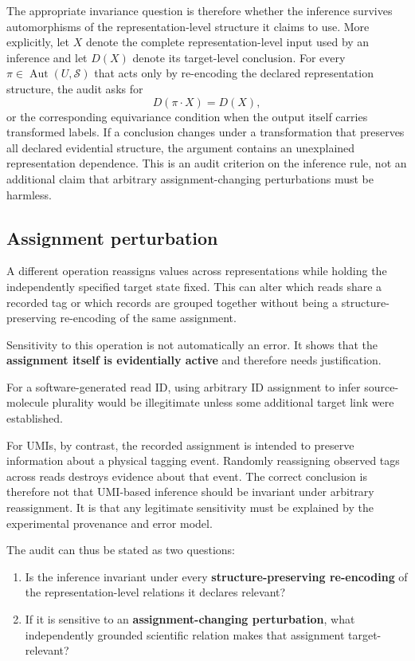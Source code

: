 \documentclass[11pt]{article}
\begin{document}
The appropriate invariance question is therefore whether the inference survives automorphisms of the representation-level structure it claims to use. More explicitly, let \(X\) denote the complete representation-level input used by an inference and let \(D(X)\) denote its target-level conclusion. For every \(\pi\in\operatorname{Aut}(U,\mathcal S)\) that acts only by re-encoding the declared representation structure, the audit asks for
\[
D(\pi\cdot X)=D(X),
\]
or the corresponding equivariance condition when the output itself carries transformed labels. If a conclusion changes under a transformation that preserves all declared evidential structure, the argument contains an unexplained representation dependence. This is an audit criterion on the inference rule, not an additional claim that arbitrary assignment-changing perturbations must be harmless.

\subsection{Assignment perturbation}

A different operation reassigns values across representations while holding the independently specified target state fixed. This can alter which reads share a recorded tag or which records are grouped together without being a structure-preserving re-encoding of the same assignment.

Sensitivity to this operation is not automatically an error. It shows that the \textbf{assignment itself is evidentially active} and therefore needs justification.

For a software-generated read ID, using arbitrary ID assignment to infer source-molecule plurality would be illegitimate unless some additional target link were established.

For UMIs, by contrast, the recorded assignment is intended to preserve information about a physical tagging event. Randomly reassigning observed tags across reads destroys evidence about that event. The correct conclusion is therefore not that UMI-based inference should be invariant under arbitrary reassignment. It is that any legitimate sensitivity must be explained by the experimental provenance and error model.

The audit can thus be stated as two questions:

\begin{enumerate}[leftmargin=*]
\item Is the inference invariant under every \textbf{structure-preserving re-encoding} of the representation-level relations it declares relevant?
\item If it is sensitive to an \textbf{assignment-changing perturbation}, what independently grounded scientific relation makes that assignment target-relevant?
\end{enumerate}
\end{document}
